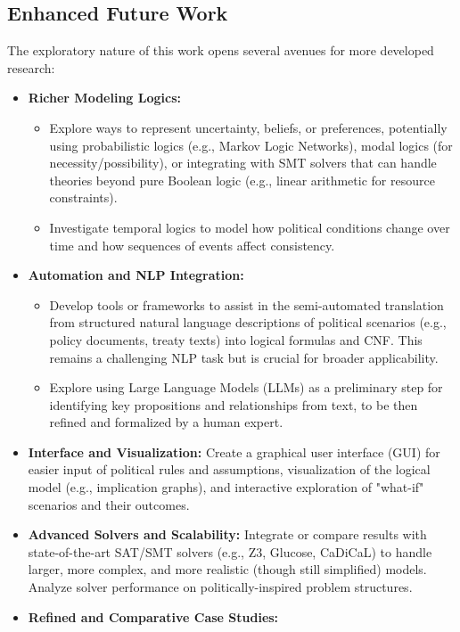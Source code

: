 \documentclass[11pt, a4paper]{article}
\begin{document}
\subsection*{Enhanced Future Work}
The exploratory nature of this work opens several avenues for more developed research:
\begin{itemize}
    \item \textbf{Richer Modeling Logics:}
        \begin{itemize}
            \item Explore ways to represent uncertainty, beliefs, or preferences, potentially using probabilistic logics (e.g., Markov Logic Networks), modal logics (for necessity/possibility), or integrating with SMT solvers that can handle theories beyond pure Boolean logic (e.g., linear arithmetic for resource constraints).
            \item Investigate temporal logics to model how political conditions change over time and how sequences of events affect consistency.
        \end{itemize}
    \item \textbf{Automation and NLP Integration:}
        \begin{itemize}
            \item Develop tools or frameworks to assist in the semi-automated translation from structured natural language descriptions of political scenarios (e.g., policy documents, treaty texts) into logical formulas and CNF. This remains a challenging NLP task but is crucial for broader applicability.
            \item Explore using Large Language Models (LLMs) as a preliminary step for identifying key propositions and relationships from text, to be then refined and formalized by a human expert.
        \end{itemize}
    \item \textbf{Interface and Visualization:} Create a graphical user interface (GUI) for easier input of political rules and assumptions, visualization of the logical model (e.g., implication graphs), and interactive exploration of "what-if" scenarios and their outcomes.
    \item \textbf{Advanced Solvers and Scalability:} Integrate or compare results with state-of-the-art SAT/SMT solvers (e.g., Z3, Glucose, CaDiCaL) to handle larger, more complex, and more realistic (though still simplified) models. Analyze solver performance on politically-inspired problem structures.
    \item \textbf{Refined and Comparative Case Studies:}

\end{itemize}
\end{document}
